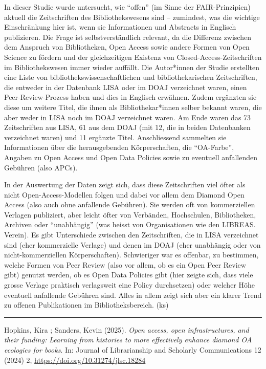 \documentclass[a4paper,
fontsize=11pt,
oneside,
numbers=noperiodatend,
parskip=half-,
bibliography=totoc,
final
]{scrartcl}
\begin{document}
In dieser Studie wurde untersucht, wie \enquote{offen} (im Sinne der
FAIR-Prinzipien) aktuell die Zeitschriften des Bibliothekswesens sind --
zumindest, was die wichtige Einschränkung hier ist, wenn sie
Informationen und Abstracts in Englisch publizieren. Die Frage ist
selbstverständlich relevant, da die Differenz zwischen dem Anspruch von
Bibliotheken, Open Access sowie andere Formen von Open Science zu
fördern und der gleichzeitigen Existenz von Closed-Access-Zeitschriften
im Bibliothekswesen immer wieder auffällt. Die Autor*innen der Studie
erstellten eine Liste von bibliothekswissenschaftlichen und
bibliothekarischen Zeitschriften, die entweder in der Datenbank LISA
oder im DOAJ verzeichnet waren, einen Peer-Review-Prozess haben und dies
in Englisch erwähnen. Zudem ergänzten sie diese um weitere Titel, die
ihnen als Bibliothekar*innen selber bekannt waren, die aber weder in
LISA noch im DOAJ verzeichnet waren. Am Ende waren das 73 Zeitschriften
aus LISA, 61 aus dem DOAJ (mit 12, die in beiden Datenbanken verzeichnet
waren) und 11 ergänzte Titel. Anschliessend sammelten sie Informationen
über die herausgebenden Körperschaften, die \enquote{OA-Farbe}, Angaben
zu Open Access und Open Data Policies sowie zu eventuell anfallenden
Gebühren (also APCs).

In der Auswertung der Daten zeigt sich, dass diese Zeitschriften viel
öfter als nicht Open-Access-Modellen folgen und dabei vor allem dem
Diamond Open Access (also auch ohne anfallende Gebühren). Sie werden oft
von kommerziellen Verlagen publiziert, aber leicht öfter von Verbänden,
Hochschulen, Bibliotheken, Archiven oder \enquote{unabhängig} (was
heisst von Organisationen wie den LIBREAS. Verein). Es gibt Unterschiede
zwischen den Zeitschriften, die in LISA verzeichnet sind (eher
kommerzielle Verlage) und denen im DOAJ (eher unabhängig oder von
nicht-kommerziellen Körperschaften). Schwieriger war es offenbar, zu
bestimmen, welche Formen von Peer Review (also vor allem, ob es ein Open
Peer Review gibt) genutzt werden, ob es Open Data Policies gibt (hier
zeigte sich, dass viele grosse Verlage praktisch verlagsweit eine Policy
durchsetzen) oder welcher Höhe eventuell anfallende Gebühren sind. Alles
in allem zeigt sich aber ein klarer Trend zu offenen Publikationen im
Bibliotheksbereich. (ks)

\begin{center}\rule{0.5\linewidth}{0.5pt}\end{center}

Hopkins, Kira ; Sanders, Kevin (2025). \emph{Open access, open
infrastructures, and their funding: Learning from histories to more
effectively enhance diamond OA ecologies for books}. In: Journal of
Librarianship and Scholarly Communications 12 (2024) 2,
\url{https://doi.org/10.31274/jlsc.18284}
\end{document}
